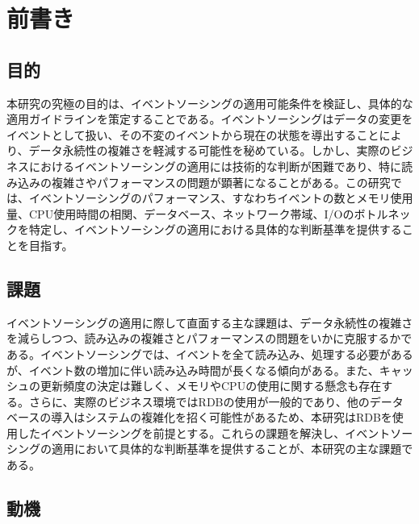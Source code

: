 \documentclass[../../main]{subfiles}
\begin{document}
    \section{前書き}\label{sec:preface}

    \subsection{目的}\label{subsec:preface-purpose}

    本研究の究極の目的は、イベントソーシングの適用可能条件を検証し、具体的な適用ガイドラインを策定することである。イベントソーシングはデータの変更をイベントとして扱い、その不変のイベントから現在の状態を導出することにより、データ永続性の複雑さを軽減する可能性を秘めている。しかし、実際のビジネスにおけるイベントソーシングの適用には技術的な判断が困難であり、特に読み込みの複雑さやパフォーマンスの問題が顕著になることがある。この研究では、イベントソーシングのパフォーマンス、すなわちイベントの数とメモリ使用量、CPU使用時間の相関、データベース、ネットワーク帯域、I/Oのボトルネックを特定し、イベントソーシングの適用における具体的な判断基準を提供することを目指す。

    \subsection{課題}\label{subsec:preface-problem}

    イベントソーシングの適用に際して直面する主な課題は、データ永続性の複雑さを減らしつつ、読み込みの複雑さとパフォーマンスの問題をいかに克服するかである。イベントソーシングでは、イベントを全て読み込み、処理する必要があるが、イベント数の増加に伴い読み込み時間が長くなる傾向がある。また、キャッシュの更新頻度の決定は難しく、メモリやCPUの使用に関する懸念も存在する。さらに、実際のビジネス環境ではRDBの使用が一般的であり、他のデータベースの導入はシステムの複雑化を招く可能性があるため、本研究はRDBを使用したイベントソーシングを前提とする。これらの課題を解決し、イベントソーシングの適用において具体的な判断基準を提供することが、本研究の主な課題である。

    \subsection{動機}\label{subsec:preface-motive}
\end{document}
